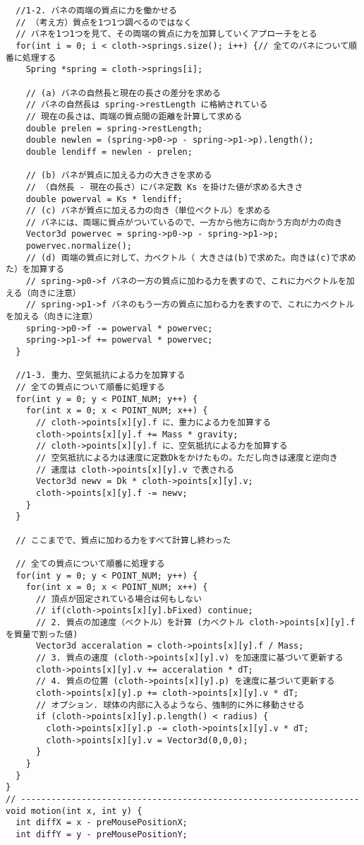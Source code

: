 \documentclass{scrartcl}
\begin{document}
\begin{verbatim}
  //1-2. バネの両端の質点に力を働かせる
  // （考え方）質点を1つ1つ調べるのではなく
  // バネを1つ1つを見て、その両端の質点に力を加算していくアプローチをとる
  for(int i = 0; i < cloth->springs.size(); i++) {// 全てのバネについて順番に処理する
    Spring *spring = cloth->springs[i]; 

    // (a) バネの自然長と現在の長さの差分を求める
    // バネの自然長は spring->restLength に格納されている
    // 現在の長さは、両端の質点間の距離を計算して求める
    double prelen = spring->restLength;
    double newlen = (spring->p0->p - spring->p1->p).length();
    double lendiff = newlen - prelen;

    // (b) バネが質点に加える力の大きさを求める
    // （自然長 - 現在の長さ）にバネ定数 Ks を掛けた値が求める大きさ
    double powerval = Ks * lendiff;
    // (c) バネが質点に加える力の向き（単位ベクトル）を求める
    // バネには、両端に質点がついているので、一方から他方に向かう方向が力の向き
    Vector3d powervec = spring->p0->p - spring->p1->p;
    powervec.normalize();
    // (d) 両端の質点に対して、力ベクトル（ 大きさは(b)で求めた。向きは(c)で求めた）を加算する
    // spring->p0->f バネの一方の質点に加わる力を表すので、これに力ベクトルを加える（向きに注意）
    // spring->p1->f バネのもう一方の質点に加わる力を表すので、これに力ベクトルを加える（向きに注意）
    spring->p0->f -= powerval * powervec;
    spring->p1->f += powerval * powervec;
  }

  //1-3. 重力、空気抵抗による力を加算する
  // 全ての質点について順番に処理する
  for(int y = 0; y < POINT_NUM; y++) {
    for(int x = 0; x < POINT_NUM; x++) {
      // cloth->points[x][y].f に、重力による力を加算する
      cloth->points[x][y].f += Mass * gravity;
      // cloth->points[x][y].f に、空気抵抗による力を加算する
      // 空気抵抗による力は速度に定数Dkをかけたもの。ただし向きは速度と逆向き
      // 速度は cloth->points[x][y].v で表される
      Vector3d newv = Dk * cloth->points[x][y].v;
      cloth->points[x][y].f -= newv;
    }
  }

  // ここまでで、質点に加わる力をすべて計算し終わった

  // 全ての質点について順番に処理する
  for(int y = 0; y < POINT_NUM; y++) {
    for(int x = 0; x < POINT_NUM; x++) {
      // 頂点が固定されている場合は何もしない
      // if(cloth->points[x][y].bFixed) continue;			
      // 2. 質点の加速度（ベクトル）を計算 (力ベクトル cloth->points[x][y].f を質量で割った値)
      Vector3d acceralation = cloth->points[x][y].f / Mass;
      // 3. 質点の速度 (cloth->points[x][y].v) を加速度に基づいて更新する
      cloth->points[x][y].v += acceralation * dT;
      // 4. 質点の位置 (cloth->points[x][y].p) を速度に基づいて更新する
      cloth->points[x][y].p += cloth->points[x][y].v * dT;
      // オプション. 球体の内部に入るようなら、強制的に外に移動させる
      if (cloth->points[x][y].p.length() < radius) {
        cloth->points[x][y].p -= cloth->points[x][y].v * dT;
        cloth->points[x][y].v = Vector3d(0,0,0);
      }
    }
  }
}
// -------------------------------------------------------------------
void motion(int x, int y) {
  int diffX = x - preMousePositionX;
  int diffY = y - preMousePositionY;


\end{verbatim}
\end{document}
